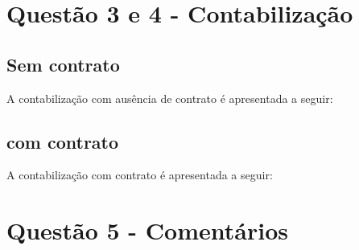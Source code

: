 \documentclass[a4paper,12pt,twoside]{article}
\begin{document}
\newpage

\section{Questão 3 e 4 - Contabilização}
\subsection{Sem contrato}
A contabilização com ausência de contrato é apresentada a seguir:

\subsection{com contrato}
A contabilização com contrato é apresentada a seguir:

\section{Questão 5 - Comentários}
\end{document}
